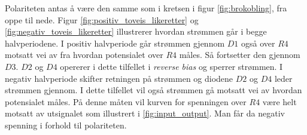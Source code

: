             Polariteten antas å være den samme som i kretsen i figur \ref{fig:brokobling}, fra oppe til nede. Figur \ref{fig:positiv_toveis_likeretter} og \ref{fig:negativ_toveis_likeretter} illustrerer hvordan strømmen går i begge halvperiodene. 
            I positiv halvperiode går strømmen gjennom $D1$ også over $R4$ motsatt vei av fra hvordan potensialet over $R4$ måles. Så fortsetter den gjennom $D3$. $D2$ og $D4$ opererer i dette tilfellet i \textit{reverse bias} og sperrer strømmen.
            I negativ halvperiode skifter retningen på strømmen og diodene $D2$ og $D4$ leder strømmen gjennom. I dette tilfellet vil også strømmen gå motsatt vei av hvordan potensialet måles. På denne måten vil kurven for spenningen over $R4$ være helt motsatt av utsignalet som illustrert i \ref{fig:input_output}. Man får da negativ spenning i forhold til polariteten.
